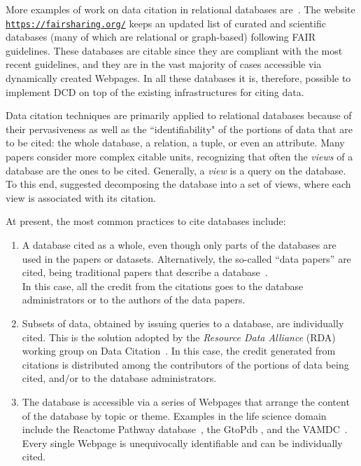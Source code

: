 More examples of work on data citation in relational databases are~\citep{bunemann2016citation, WuSIGMOD18, AlawiniDHW17,davidson2017model}. 
The website \texttt{\url{https://fairsharing.org/}} keeps an updated list of curated and scientific databases (many of which are relational or graph-based) following FAIR guidelines. These databases are citable since they are compliant with the most recent guidelines, and they are in the vast majority of cases accessible via dynamically created Webpages. 
In all these databases it is, therefore, possible to implement DCD on top of the existing infrastructures for citing data.

Data citation techniques are primarily applied to relational databases because of their pervasiveness as well as the ``identifiability" of the portions of data that are to be cited: the whole database, a relation, a tuple, or even an attribute. 
Many papers \citep{buneman2006cite, bunemann2016citation, AlawiniDHW17} consider more complex citable units, recognizing that often the \emph{views} of a database are the ones to be cited. Generally, a \emph{view} is a query on the database.
To this end, \citep{WuSIGMOD18} suggested decomposing the database into a set of views, where each view is associated with its citation. 


At present, the most common practices to cite databases include:
\begin{enumerate}
    \item A database cited as a whole, even though only parts of the databases are used in the papers or datasets. Alternatively, the so-called ``data papers'' are cited, being traditional papers that describe a database~\citep{CandelaEtAl2015}. \\
    In this case, all the credit from the citations goes to the database administrators or to the authors of the data papers. 
    \item Subsets of data, obtained by issuing queries to a database, are individually cited. This is the solution adopted by the \emph{Resource Data Alliance} (RDA) working group on Data Citation~\citep{RauberEtAl2016}.
    In this case, the credit generated from citations is distributed among the contributors of the portions of data being cited, and/or to the database administrators. 
    \item The database is accessible via a series of Webpages that arrange the content of the database by topic or theme. Examples in the life science domain include the Reactome Pathway database~\citep{reactome2016}, the GtoPdb \citep{iuphar2018}, and the VAMDC~\citep{ZwolfEtAl2016}.
     Every single Webpage is unequivocally identifiable and can be individually cited. 
\end{enumerate}

